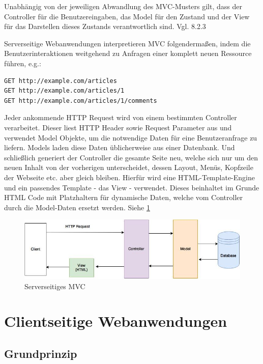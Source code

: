 Unabhängig von der jeweiligen Abwandlung des MVC-Musters gilt, dass der Controller für die Benutzereingaben, das Model für den Zustand und der View für das Darstellen dieses Zustands verantwortlich sind. Vgl. \cite{lahres2009objektorientierte} 8.2.3

Serverseitige Webanwendungen interpretieren MVC folgendermaßen, indem die Benutzerinteraktionen weitgehend zu Anfragen einer komplett neuen Ressource führen, e.g.:

\begin{verbatim}
GET http://example.com/articles
GET http://example.com/articles/1
GET http://example.com/articles/1/comments
\end{verbatim}

Jeder ankommende HTTP Request wird von einem bestimmten Controller verarbeitet. Dieser liest HTTP Header sowie Request Parameter aus und verwendet Model Objekte, um die notwendige Daten für eine Benutzeranfrage zu liefern. Models laden diese Daten üblicherweise aus einer Datenbank. Und schließlich generiert der Controller die gesamte Seite neu, welche sich nur um den neuen Inhalt von der vorherigen unterscheidet, dessen Layout, Menüs, Kopfzeile der Webseite etc. aber gleich bleiben. Hierfür wird eine HTML-Template-Engine und ein passendes Template - das View - verwendet. Dieses beinhaltet im Grunde HTML Code mit Platzhaltern für dynamische Daten, welche vom Controller durch die Model-Daten ersetzt werden. Siehe \ref{fig:server_side_mvc}

\begin{figure}[htp]     %
\centering
\includegraphics[width=1.0\textwidth]{images/server_side_mvc}
\caption{Serverseitiges MVC}\label{fig:server_side_mvc}
\end{figure}

\section{Clientseitige Webanwendungen}
\label{sec:client_side_web_apps}

\subsection{Grundprinzip}

